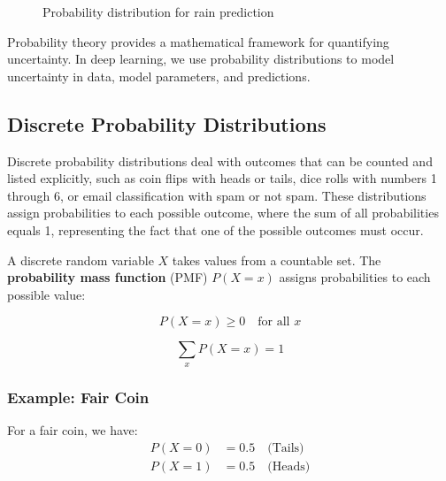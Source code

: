 \begin{figure}[h]
\centering
{}
\caption{Probability distribution for rain prediction}
\label{fig:rain-probability}
\end{figure}

Probability theory provides a mathematical framework for quantifying uncertainty. In deep learning, we use probability distributions to model uncertainty in data, model parameters, and predictions.

\subsection{Discrete Probability Distributions}

Discrete probability distributions deal with outcomes that can be counted and listed explicitly, such as coin flips with heads or tails, dice rolls with numbers 1 through 6, or email classification with spam or not spam. These distributions assign probabilities to each possible outcome, where the sum of all probabilities equals 1, representing the fact that one of the possible outcomes must occur.

A discrete random variable $X$ takes values from a countable set. The \textbf{probability mass function} (PMF) $P(X=x)$ assigns probabilities to each possible value:

\begin{equation}
P(X=x) \geq 0 \quad \text{for all } x
\end{equation}

\begin{equation}
\sum_{x} P(X=x) = 1
\end{equation}

\subsubsection{Example: Fair Coin}

For a fair coin, we have:
\begin{align}
P(X=0) &= 0.5 \quad \text{(Tails)} \\
P(X=1) &= 0.5 \quad \text{(Heads)}
\end{align}

